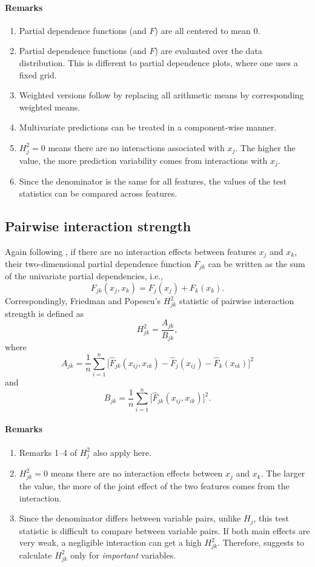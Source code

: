 \documentclass[]{article}
\begin{document}
\paragraph{Remarks}
\begin{enumerate}
	\item Partial dependence functions (and $F$) are all centered to mean 0.
	\item Partial dependence functions (and $F$) are evaluated over the data distribution. This is different to partial dependence plots, where one uses a fixed grid.
	\item Weighted versions follow by replacing all arithmetic means by corresponding weighted means.
	\item Multivariate predictions can be treated in a component-wise manner.
	\item $H^2_j = 0$ means there are no interactions associated with $x_j$. The higher the value, the more prediction variability comes from interactions with $x_j$.
	\item Since the denominator is the same for all features, the values of the test statistics can be compared across features.
\end{enumerate}

\subsection{Pairwise interaction strength}
Again following \cite{friedman2008}, if there are no interaction effects between features $x_j$ and $x_k$, their two-dimensional partial dependence function $F_{jk}$ can be written as the sum of the univariate partial dependencies, i.e.,
$$
  F_{jk}(x_j, x_k) = F_j(x_j)+ F_k(x_k).
$$
Correspondingly, Friedman and Popescu's $H_{jk}^2$ statistic of pairwise interaction strength is defined as
$$
  H_{jk}^2 = \frac{A_{jk}}{B_{jk}},
$$
where 
$$
  A_{jk} = \frac{1}{n} \sum_{i = 1}^n\big[\hat F_{jk}(x_{ij}, x_{ik}) - \hat F_j(x_{ij}) - \hat F_k(x_{ik})\big]^2
$$
and
$$
  B_{jk} = \frac{1}{n} \sum_{i = 1}^n\big[\hat F_{jk}(x_{ij}, x_{ik})\big]^2.
$$
\paragraph{Remarks}
\begin{enumerate}
	\item Remarks 1--4 of $H^2_{j}$ also apply here.
	\item $H^2_{jk} = 0$ means there are no interaction effects between $x_j$ and $x_k$. The larger the value, the more of the joint effect of the two features comes from the interaction.
	\item Since the denominator differs between variable pairs, unlike $H_j$, this test statistic is difficult to compare between variable pairs. If both main effects are very weak, a negligible interaction can get a high $H^2_{jk}$. Therefore, \cite{friedman2008} suggests to calculate $H^2_{jk}$ only for {\em important} variables.
\end{enumerate}
\end{document}
